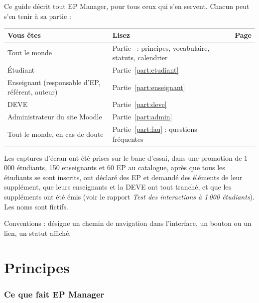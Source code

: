 \documentclass[11pt,a4paper]{article}
\begin{document}
Ce guide décrit tout EP Manager, pour tous ceux qui s'en servent. Chacun peut s'en tenir à sa
partie :
\begin{center}
\begin{tabularx}{\linewidth}{@{}l X r@{}}
\toprule
\textbf{Vous êtes} & \textbf{Lisez} & \textbf{Page} \\
\midrule
Tout le monde & Partie~\ref{part:principes} : principes, vocabulaire, statuts, calendrier &
\pageref{part:principes} \\
Étudiant & Partie~\ref{part:etudiant} & \pageref{part:etudiant} \\
Enseignant (responsable d'EP, référent, auteur) & Partie~\ref{part:enseignant} &
\pageref{part:enseignant} \\
DEVE & Partie~\ref{part:deve} & \pageref{part:deve} \\
Administrateur du site Moodle & Partie~\ref{part:admin} & \pageref{part:admin} \\
Tout le monde, en cas de doute & Partie~\ref{part:faq} : questions fréquentes &
\pageref{part:faq} \\
\bottomrule
\end{tabularx}
\end{center}

Les captures d'écran ont été prises sur le banc d'essai, dans une promotion de 1\,000 étudiants,
150 enseignants et 60 EP au catalogue, après que tous les étudiants se sont inscrits, ont
déclaré des EP et demandé des éléments de leur supplément, que leurs enseignants et la DEVE ont
tout tranché, et que les suppléments ont été émis (voir le rapport \emph{Test des interactions
à 1\,000 étudiants}). Les noms sont fictifs.

Conventions :  désigne un chemin de navigation dans
l'interface,  un bouton ou un lien,  un statut affiché.

\newpage

\part{Principes}\label{part:principes}

\section{Ce que fait EP Manager}
\end{document}

